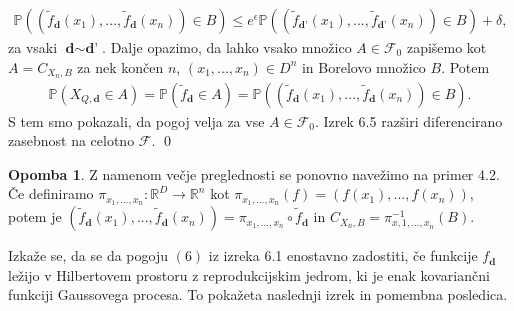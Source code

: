 \documentclass[12pt,a4paper]{amsart}
\theoremstyle{definition} %
\newtheorem{opomba}[definicija]{Opomba}
\theoremstyle{plain} %
\begin{document}
\begin{gather*}
\mathbb{P}((\tilde{f}_{\textbf{d}}(x_1),...,\tilde{f}_{\textbf{d}}(x_n)) \in B) \leq e^{\epsilon}\mathbb{P}((\tilde{f}_{\textbf{d'}}(x_1),...,\tilde{f}_{\textbf{d'}}(x_n)) \in B) + \delta,
\end{gather*}
za vsaki $\textbf{d} \sim \textbf{d'}$. Dalje opazimo, da lahko vsako množico $A \in \mathcal{F}_0$ zapišemo kot $A = C_{X_n,B}$ za nek končen $n$, $(x_1,...,x_n) \in D^n$ in Borelovo množico $B$. Potem 
\begin{gather*}
\mathbb{P}(X_{Q,\textbf{d}} \in A) = \mathbb{P}(\tilde{f}_{\textbf{d}}\in A)= \mathbb{P}((\tilde{f}_{\textbf{d}}(x_1),...,\tilde{f}_{\textbf{d}}(x_n)) \in B).
\end{gather*}
S tem smo pokazali, da pogoj velja za vse $A \in \mathcal{F}_0$. Izrek 6.5 razširi diferencirano zasebnost na celotno $\mathcal{F}$.
\qed
\newline
\newline
\begin{opomba}
Z namenom večje preglednosti se ponovno navežimo na primer 4.2. Če definiramo $\pi_{x_1,...,x_n} : \mathbb{R}^D \rightarrow \mathbb{R}^n$ kot $\pi_{x_1,...,x_n}(f) = (f(x_1),...,f(x_n))$, potem je $(\tilde{f}_{\textbf{d}}(x_1),...,\tilde{f}_{\textbf{d}}(x_n)) = \pi_{x_1,...,x_n} \circ \tilde{f}_{\textbf{d}}$ in $C_{X_n,B} = \pi_{x,1,...,x_n}^{-1}(B)$.
\end{opomba}
Izkaže se, da se da pogoju $(6)$ iz izreka 6.1 enostavno zadostiti, če funkcije $f_{\textbf{d}}$ ležijo v Hilbertovem prostoru z reprodukcijskim jedrom, ki je enak kovariančni funkciji Gaussovega procesa. To pokažeta naslednji izrek in pomembna posledica.
\end{document}
